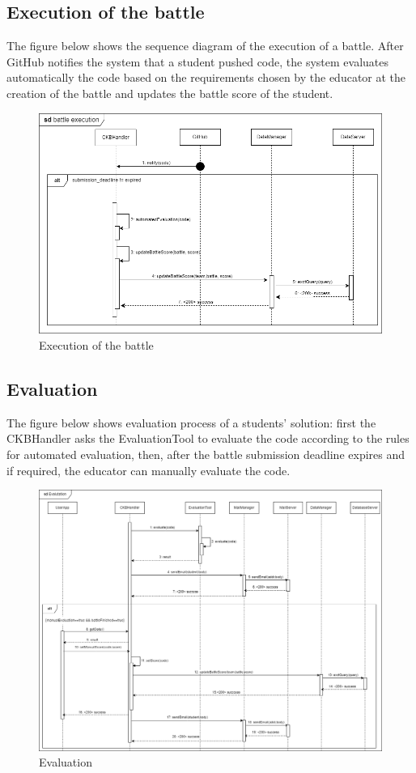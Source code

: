 \subsection{Execution of the battle}
The figure below shows the sequence diagram of the execution of a battle. After GitHub notifies the system that a student pushed code, the system
evaluates automatically the code based on the requirements chosen by the educator at the creation of the battle and
updates the battle score of the student.
\begin{figure}[H]
    \centering
    \includegraphics[width=1\textwidth]{images/seq_diagrams/battle_execution_DD.png}
    \caption{Execution of the battle}
\end{figure}

\subsection{Evaluation}
The figure below shows evaluation process of a students' solution: first the CKBHandler asks the EvaluationTool to evaluate the 
code according to the rules for automated evaluation, then, after the battle submission deadline expires and if required, the 
educator can manually evaluate the code.\\
\begin{figure}[H]
    \centering
    \includegraphics[width=1\textwidth]{images/seq_diagrams/evaluation_DD.png}
    \caption{Evaluation}
\end{figure}

